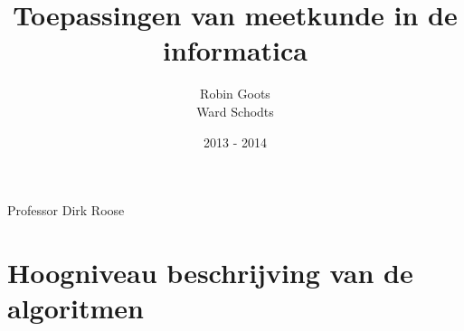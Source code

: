 \documentclass[11pt,a4paper]{article}
\begin{document}
\begin{titlepage}

\title{\Huge Toepassingen van meetkunde in de informatica}

\author{Robin Goots\\
		Ward Schodts\\
		}

\date{2013 - 2014}
\maketitle
\thispagestyle{empty}


\begin{center}
\Large Professor Dirk Roose
\vfill
\end{center}
\end{titlepage}

\section{Hoogniveau beschrijving van de algoritmen}
\end{document}
